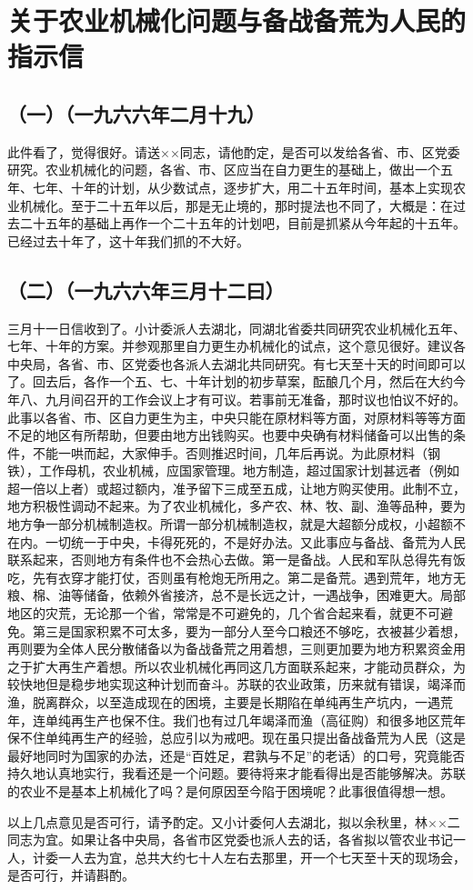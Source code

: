 \section[关于农业机械化问题与备战备荒为人民的指示信（一）（一九六六年二月十九曰）]{关于农业机械化问题与备战备荒为人民的指示信}
\subsection{（一）（一九六六年二月十九）}


此件看了，觉得很好。请送××同志，请他酌定，是否可以发给各省、市、区党委研究。农业机械化的问题，各省、市、区应当在自力更生的基础上，做出一个五年、七年、十年的计划，从少数试点，逐步扩大，用二十五年时间，基本上实现农业机械化。至于二十五年以后，那是无止境的，那时提法也不同了，大概是：在过去二十五年的基础上再作一个二十五年的计划吧，目前是抓紧从今年起的十五年。已经过去十年了，这十年我们抓的不大好。


\subsection{（二）（一九六六年三月十二曰）}

三月十一日信收到了。小计委派人去湖北，同湖北省委共同研究农业机械化五年、七年、十年的方案。并参观那里自力更生办机械化的试点，这个意见很好。建议各中央局，各省、市、区党委也各派人去湖北共同研究。有七天至十天的时间即可以了。回去后，各作一个五、七、十年计划的初步草案，酝酿几个月，然后在大约今年八、九月间召开的工作会议上才有可议。若事前无准备，那时议也怕议不好的。此事以各省、市、区自力更生为主，中央只能在原材料等方面，对原材料等等方面不足的地区有所帮助，但要由地方出钱购买。也要中央确有材料储备可以出售的条件，不能一哄而起，大家伸手。否则推迟时间，几年后再说。为此原材料（钢铁），工作母机，农业机械，应国家管理。地方制造，超过国家计划甚远者（例如超一倍以上者）或超过额内，准予留下三成至五成，让地方购买使用。此制不立，地方积极性调动不起来。为了农业机械化，多产农、林、牧、副、渔等品种，要为地方争一部分机械制造权。所谓一部分机械制造权，就是大超额分成权，小超额不在内。一切统一于中央，卡得死死的，不是好办法。又此事应与备战、备荒为人民联系起来，否则地方有条件也不会热心去做。第一是备战。人民和军队总得先有饭吃，先有衣穿才能打仗，否则虽有枪炮无所用之。第二是备荒。遇到荒年，地方无粮、棉、油等储备，依赖外省接济，总不是长远之计，一遇战争，困难更大。局部地区的灾荒，无论那一个省，常常是不可避免的，几个省合起来看，就更不可避免。第三是国家积累不可太多，要为一部分人至今口粮还不够吃，衣被甚少着想，再则要为全体人民分散储备以为备战备荒之用着想，三则更加要为地方积累资金用之于扩大再生产着想。所以农业机械化再同这几方面联系起来，才能动员群众，为较快地但是稳步地实现这种计划而奋斗。苏联的农业政策，历来就有错误，竭泽而渔，脱离群众，以至造成现在的困境，主要是长期陷在单纯再生产坑内，一遇荒年，连单纯再生产也保不住。我们也有过几年竭泽而渔（高征购）和很多地区荒年保不住单纯再生产的经验，总应引以为戒吧。现在虽只提出备战备荒为人民（这是最好地同时为国家的办法，还是“百姓足，君孰与不足”的老话）的口号，究竟能否持久地认真地实行，我看还是一个问题。要待将来才能看得出是否能够解决。苏联的农业不是基本上机械化了吗？是何原因至今陷于困境呢？此事很值得想一想。

以上几点意见是否可行，请予酌定。又小计委何人去湖北，拟以余秋里，林××二同志为宜。如果让各中央局，各省市区党委也派人去的话，各省拟以管农业书记一人，计委一人去为宜，总共大约七十人左右去那里，开一个七天至十天的现场会，是否可行，并请斟酌。


